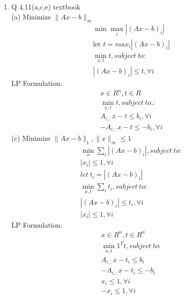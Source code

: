 \documentclass[12pt,letter]{article}
\newcommand{\norm}[1]{\|#1\|}
\begin{document}


\begin{enumerate}
\item Q 4.11(a,c,e) textbook\\
  (a) Minimize $\norm{Ax-b}_{\infty}$
    \begin{align*}
      \min \max_i |(Ax-b)_i|\\
      \text{let } t = max_i |(Ax-b)_i|\\
      \min_{x,t} t, subject\ to:\\
      |(Ax-b)_i| \leq t, \forall i
    \end{align*}
    LP Formulation:
    \begin{align*}
      x \in R^n, t \in R\\
      \min_{x,t} t, subject\ to.:\\
      A_{i,:}x - t \leq b_i, \forall i\\
      -A_{i,:}x - t \leq - b_i, \forall i
    \end{align*}
  (c) Minimize $\norm{Ax-b}_1, \norm{x}_{\infty} \leq 1$
    \begin{align*}
      \min_x \sum_i |(Ax-b)_i|, subject\ to:\\
      |x_i| \leq 1, \forall i\\
      let\ t_i=|(Ax-b)_i|\\
      \min_{x,t} \sum_i t_i, subject\ to:\\
      |(Ax-b)_i| \leq t_i, \forall i\\
      |x_i| \leq 1, \forall i
    \end{align*}
    LP Formulation:
    \begin{align*}
      x \in R^n, t \in R^n\\
      \min_{x,t} 1^T t, subject\ to:\\
      A_{i,:}x - t_i \leq b_i\\
      -A_{i,:}x - t_i \leq -b_i\\
      x_i \leq 1, \forall i\\
      -x_i \leq 1, \forall i\\      
    \end{align*}
    
    \pagebreak
    

\end{enumerate}
\end{document}
